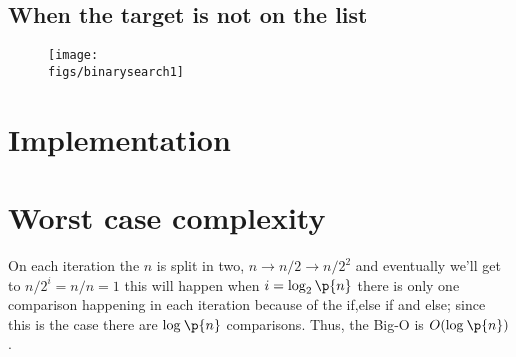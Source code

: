 \subsection{When the target is not on the list}
\begin{figure}[H]
    \centering
    \texttt{[image: \\figs/binarysearch1]} 
\end{figure}

\section{Implementation}

\section{Worst case complexity}
On each iteration the $n$ is split in two, $n \rightarrow n/2 \rightarrow n / 2^2$ and eventually we'll get to $n/2^i = n / n = 1$ this will happen when $i = \log_{2}\p{ n } $ there is only one comparison happening in each iteration because of the if,else if and else; since this is the case there are $\log_{}\p{n}$ comparisons. Thus, the Big-O is $O(\log_{}\p{ n } )$.
